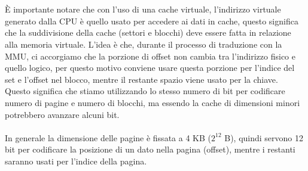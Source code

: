 \\
\\
\MakeUppercase{è} importante notare che con l'uso di una cache virtuale, l'indirizzo virtuale generato dalla CPU è quello usato per accedere ai dati in cache, questo significa che la suddivisione della cache (settori e blocchi) deve essere fatta in relazione alla memoria virtuale. L'idea è che, durante il processo di traduzione con la MMU, ci accorgiamo che la porzione di offset non cambia tra l'indirizzo fisico e quello logico, per questo motivo conviene usare questa porzione per l'indice del set e l'offset nel blocco, mentre il restante spazio viene usato per la chiave. Questo significa che stiamo utilizzando lo stesso numero di bit per codificare numero di pagine e numero di blocchi, ma essendo la cache di dimensioni minori potrebbero avanzare alcuni bit.
\\
\\
In generale la dimensione delle pagine è fissata a 4 KB ($2^{12}$ B), quindi servono 12 bit per codificare la posizione di un dato nella pagina (offset), mentre i restanti saranno usati per l'indice della pagina.

